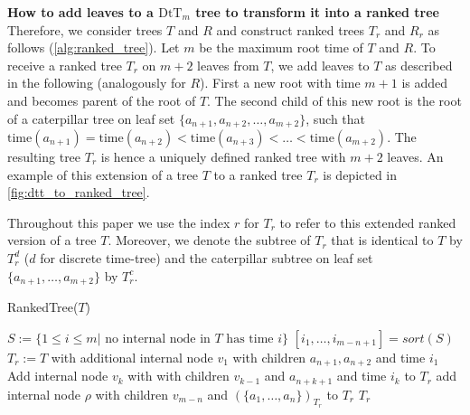 \documentclass[11pt]{amsart}
\newcommand{\ntime}{\mathrm{time}}
\newcommand{\dtt}{\mathrm{DtT}}
\newcommand{\summary}[1]{\textbf{#1}} %
\begin{document}
\summary{How to add leaves to a $\dtt_m$ tree to transform it into a ranked tree}
Therefore, we consider trees $T$ and $R$ and construct ranked trees $T_r$ and $R_r$ as follows (\autoref{alg:ranked_tree}).
Let $m$ be the maximum root time of $T$ and $R$.
To receive a ranked tree $T_r$ on $m+2$ leaves from $T$, we add leaves to $T$ as described in the following (analogously for $R$).
First a new root with time $m + 1$ is added and becomes parent of the root of $T$.
The second child of this new root is the root of a caterpillar tree on leaf set $\{a_{n+1}, a_{n+2}, \ldots, a_{m+2}\}$, such that $\ntime(a_{n+1}) = \ntime(a_{n+2}) < \ntime(a_{n+3}) < \ldots < \ntime(a_{m+2})$.
The resulting tree $T_r$ is hence a uniquely defined ranked tree with $m+2$ leaves.
An example of this extension of a tree $T$ to a ranked tree $T_r$ is depicted in \autoref{fig:dtt_to_ranked_tree}.

Throughout this paper we use the index $r$ for $T_r$ to refer to this extended ranked version of a tree $T$.
Moreover, we denote the subtree of $T_r$ that is identical to $T$ by $T_r^d$ ($d$ for discrete time-tree) and the caterpillar subtree on leaf set $\{a_{n+1}, \ldots, a_{m+2}\}$ by $T_r^c$.

\begin{algorithm}[ht]
	\caption{RankedTree($T$)}
	\label{alg:ranked_tree}
	\begin{algorithmic}[1]
		\STATE $S:= \{1 \leq i \leq m | \text{ no internal node in } T \text{ has time } i\}$
		\STATE $[i_1, \ldots, i_{m-n+1}] = sort(S)$
		\STATE $T_r := T$ with additional internal node $v_1$ with children $a_{n+1}, a_{n+2}$ and time $i_1$
			\STATE Add internal node $v_k$ with with children $v_{k-1}$ and $a_{n+k+1}$ and time $i_k$ to $T_r$
		\STATE add internal node $\rho$ with children $v_{m-n}$ and $(\{a_1, \ldots, a_n\})_{T_r}$ to $T_r$
		\ENDFOR
		\RETURN $T_r$
	\end{algorithmic}
\end{algorithm}
\end{document}
